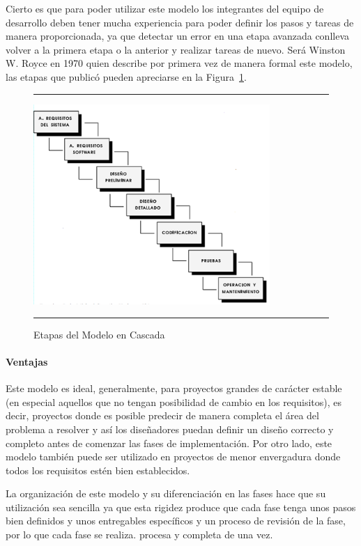 Cierto es que para poder utilizar este modelo los integrantes del
equipo de desarrollo deben tener mucha experiencia para poder definir
los pasos y tareas de manera proporcionada, ya que detectar un error
en una etapa avanzada conlleva volver a la primera etapa o la anterior
y realizar tareas de nuevo. Será Winston W. Royce en 1970 quien
describe por primera vez de manera formal este modelo, las etapas que
publicó pueden apreciarse en la Figura~\ref{fig:cascada}.\\

\begin{figure}[h]
\hrule\smallskip
\begin{center}
\includegraphics[width=0.8\textwidth]{fig/cascada.png}
\end{center}
\caption{Etapas del Modelo en Cascada}
\label{fig:cascada}
\hrule
\end{figure}

\paragraph{Ventajas}
Este modelo es ideal, generalmente, para proyectos grandes de carácter
estable (en especial aquellos que no tengan posibilidad de cambio en
los requisitos), es decir, proyectos donde es posible predecir de
manera completa el área del problema a resolver y así los diseñadores
puedan definir un diseño correcto y completo antes de comenzar las
fases de implementación. Por otro lado, este modelo también puede ser
utilizado en proyectos de menor envergadura donde todos los requisitos
estén bien establecidos.
 
La organización de este modelo y su diferenciación en las fases hace
que su utilización sea sencilla ya que esta rigidez produce que cada
fase tenga unos pasos bien definidos y unos entregables específicos y
un proceso de revisión de la fase, por lo que cada fase se
realiza. procesa y completa de una vez.


